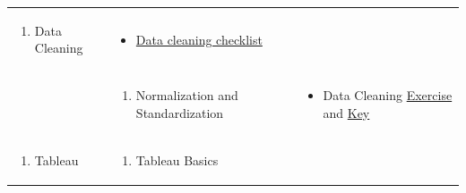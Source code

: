 \documentclass[
]{book}
\providecommand{\tightlist}{%
  \setlength{\itemsep}{0pt}\setlength{\parskip}{0pt}}
\begin{document}
\begin{longtable}[]{@{}lll@{}}
\begin{minipage}[t]{0.34\columnwidth}
\begin{enumerate}
\def\labelenumi{\arabic{enumi}.}
\setcounter{enumi}{1}
\tightlist
\item
  Data Cleaning
\end{enumerate}\strut
\end{minipage} & \begin{minipage}[t]{0.42\columnwidth}\raggedright
\begin{itemize}
\tightlist
\item
  \href{files/data_processing_checklist.docx}{Data cleaning checklist}
\end{itemize}\strut
\end{minipage}\tabularnewline
\begin{minipage}[t]{0.15\columnwidth}\raggedright
\strut
\end{minipage} & \begin{minipage}[t]{0.34\columnwidth}\raggedright
\begin{enumerate}
\def\labelenumi{\arabic{enumi}.}
\setcounter{enumi}{2}
\tightlist
\item
  Normalization and Standardization
\end{enumerate}\strut
\end{minipage} & \begin{minipage}[t]{0.42\columnwidth}\raggedright
\begin{itemize}
\tightlist
\item
  Data Cleaning \href{files/M2S3_exercise.xlsx}{Exercise} and \href{files/M2S3_exercise_key.xlsx}{Key}
\end{itemize}\strut
\end{minipage}\tabularnewline
\begin{minipage}[t]{0.15\columnwidth}\raggedright
\begin{enumerate}
\def\labelenumi{\arabic{enumi}.}
\setcounter{enumi}{2}
\tightlist
\item
  Tableau
\end{enumerate}\strut
\end{minipage} & \begin{minipage}[t]{0.34\columnwidth}\raggedright
\begin{enumerate}
\def\labelenumi{\arabic{enumi}.}
\tightlist
\item
  Tableau Basics
\end{enumerate}\strut
\end{minipage} & \begin{minipage}[t]{0.42\columnwidth}\raggedright
\begin{itemize}

\end{itemize}
\end{minipage}
\end{longtable}
\end{document}
